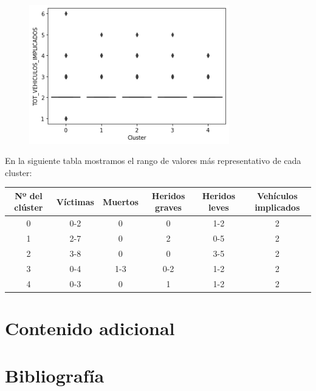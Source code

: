 \documentclass[a4]{article}
\begin{document}
\begin{figure}[H]
  \includegraphics[width=87mm]{imagenes/c1_kmeans_bp_vi}
\end{figure}

\newpage
En la siguiente tabla mostramos el rango de valores más representativo de cada cluster:

\begin{center}
\begin{tabular}{|c|c|c|c|c|c|}
\hline
\multicolumn{1}{|c|}{\textbf{Nº del clúster}} & \textbf{Víctimas} & \textbf{Muertos} & \textbf{Heridos graves} & \textbf{Heridos leves} & \textbf{Vehículos implicados}\\ \hline
  0  & 0-2 & 0   & 0   & 1-2 & 2 \\ \hline
  1  & 2-7 & 0   & 2   & 0-5 & 2 \\ \hline
  2  & 3-8 & 0   & 0   & 3-5 & 2 \\ \hline
  3  & 0-4 & 1-3 & 0-2 & 1-2 & 2 \\ \hline
  4  & 0-3 & 0   & 1   & 1-2 & 2 \\ \hline
\end{tabular}
\end{center}

\newpage
\section{Contenido adicional}
\section{Bibliografía}
\end{document}
